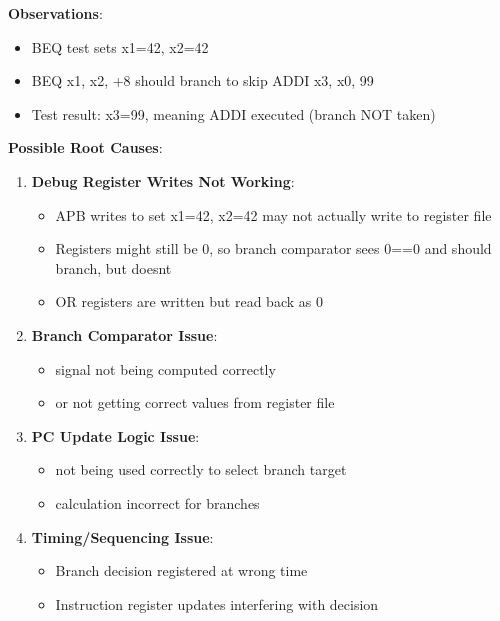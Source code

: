 \begin{record}

\textbf{Observations}:

\begin{itemize}
\tightlist
\item
  BEQ test sets x1=42, x2=42
\item
  BEQ x1, x2, +8 should branch to skip ADDI x3, x0, 99
\item
  Test result: x3=99, meaning ADDI executed (branch NOT taken)
\end{itemize}

\textbf{Possible Root Causes}:

\begin{enumerate}
\def\labelenumi{\arabic{enumi}.}
\item
  \textbf{Debug Register Writes Not Working}:

  \begin{itemize}
  \tightlist
  \item
    APB writes to set x1=42, x2=42 may not actually write to register
    file
  \item
    Registers might still be 0, so branch comparator sees 0==0 and
    should branch, but doesn\textquotesingle t
  \item
    OR registers are written but read back as 0
  \end{itemize}
\item
  \textbf{Branch Comparator Issue}:

  \begin{itemize}
  \tightlist
  \item
     signal not being computed correctly
  \item
     or  not getting correct values from
    register file
  \end{itemize}
\item
  \textbf{PC Update Logic Issue}:

  \begin{itemize}
  \tightlist
  \item
     not being used correctly to select branch target
  \item
     calculation incorrect for branches
  \end{itemize}
\item
  \textbf{Timing/\allowbreak{}Sequencing Issue}:

  \begin{itemize}
  \tightlist
  \item
    Branch decision registered at wrong time
  \item
    Instruction register updates interfering with decision
  \end{itemize}
\end{enumerate}


\end{record}
